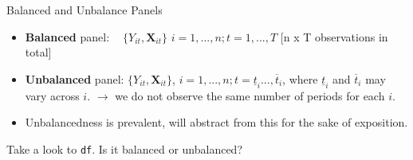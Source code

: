 \documentclass[9pt,aspectratio=169]{beamer}
\begin{document}
\begin{frame}[fragile]{Balanced and Unbalance Panels}

\begin{itemize}
    \item \textbf{Balanced} panel: $\: \: \: \: \{Y_{it}, \boldsymbol{X}_{it}\}$ $i = 1, ..., n; t = 1, . . . , T$  \color{gray}[n x T observations in total] \color{black}
    \item \textbf{Unbalanced} panel: $\{Y_{it}, \boldsymbol{X}_{it}\}$, $i = 1, ..., n; t = \underline{t}_i . . . , \overline{t}_i$,
where $\underline{t}_i$ and $\overline{t}_i$ may vary across $i$. $\rightarrow$ we do not observe the same number of periods for each $i$.
    \pause
    \item[$\rightarrow$] Unbalancedness is prevalent, will abstract from this for the sake of exposition. 
\end{itemize}
\pause
\begin{center}
    Take a look to \texttt{df}. Is it balanced or unbalanced?
\end{center}

\end{frame}
\end{document}
